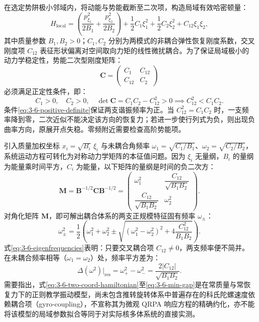 在选定势阱极小邻域内，将动能与势能截断至二次项，构造局域有效哈密顿量：
\begin{equation}\label{eq:3-6-two-coord-hamiltonian}
H_{\mathrm{local}} = \left(\frac{p_{\xi_1}^2}{2B_1} + \frac{p_{\xi_2}^2}{2B_2}\right) + \frac{1}{2} C_1 \xi_1^2 + \frac{1}{2} C_2 \xi_2^2 + C_{12} \xi_1 \xi_2 ,
\end{equation}
其中质量参数 $B_1, B_2 > 0$；$C_1, C_2$ 分别为两模式的非耦合弹性恢复刚度系数，交叉刚度项 $C_{12}$ 表征形状偏离对空间取向力矩的线性微扰耦合。为了保证局域极小的动力学稳定性，势能二次型刚度矩阵：
\begin{equation}\label{eq:3-6-stiffness-matrix}
\mathbf{C} = \begin{pmatrix} C_1 & C_{12} \\ C_{12} & C_2 \end{pmatrix}
\end{equation}
必须满足正定性条件，即：
\begin{equation}\label{eq:3-6-positive-definite}
C_1 > 0, \quad C_2 > 0, \quad \det\mathbf{C} = C_1 C_2 - C_{12}^2 > 0 \implies C_{12}^2 < C_1 C_2 .
\end{equation}
条件\eqref{eq:3-6-positive-definite}保证两支谐振频率为正。当 $C_{12}^2=C_1C_2$ 时，一支频率降到零，二次近似不能决定该方向的恢复力；若进一步使行列式为负，则出现负曲率方向，原展开点失稳。零频附近需要检查高阶势能项。

引入质量加权坐标 $x_i = \sqrt{B_i}\,\xi_i$ 与未耦合角频率 $\omega_1 = \sqrt{C_1/B_1}$、$\omega_2 = \sqrt{C_2/B_2}$，系统运动方程可转化为对称动力学矩阵的本征值问题。因为 $\xi_i$ 无量纲，$B_i$ 的量纲为能量乘时间平方，$C_i$ 为能量，以下矩阵的量纲是时间的负二次方：
\begin{equation}\label{eq:3-6-dynamic-matrix}
\mathbf{M} = \mathbf{B}^{-1/2} \mathbf{C} \mathbf{B}^{-1/2} = \begin{pmatrix} \omega_1^2 & \dfrac{C_{12}}{\sqrt{B_1 B_2}} \\ \dfrac{C_{12}}{\sqrt{B_1 B_2}} & \omega_2^2 \end{pmatrix} .
\end{equation}
对角化矩阵 $\mathbf{M}$，即可解出耦合体系的两支正规模特征固有频率 $\omega_\pm$：
\begin{equation}\label{eq:3-6-eigenfrequencies}
\omega_\pm^2 = \frac{1}{2}\left(\omega_1^2 + \omega_2^2 \pm \sqrt{(\omega_1^2 - \omega_2^2)^2 + 4 \frac{C_{12}^2}{B_1 B_2}}\right) .
\end{equation}
式\eqref{eq:3-6-eigenfrequencies}表明：只要交叉耦合项 $C_{12} \neq 0$，两支频率便不简并。在未耦合频率相等（$\omega_1 = \omega_2$）处，频率平方差为：
\begin{equation}\label{eq:3-6-min-gap}
\Delta(\omega^2)\big|_{\mathrm{res}} = \omega_+^2 - \omega_-^2 = \frac{2 |C_{12}|}{\sqrt{B_1 B_2}} .
\end{equation}
需要指出，式\eqref{eq:3-6-two-coord-hamiltonian}至\eqref{eq:3-6-min-gap}是在常质量与常恢复力下的正则教学振动模型，尚未包含推转旋转体系中普遍存在的科氏陀螺速度依赖耦合项（gyro-coupling），不宣称其为微观 QRPA 响应方程的精确约化，亦不能将该模型的局域参数拟合等同于对实际核多体系统的直接实测。

